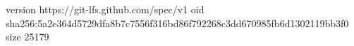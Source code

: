 version https://git-lfs.github.com/spec/v1
oid sha256:5a2e364d5729dfa8b7c7556f316bd86f792268c3dd670985fb6d1302119bb3f0
size 25179
